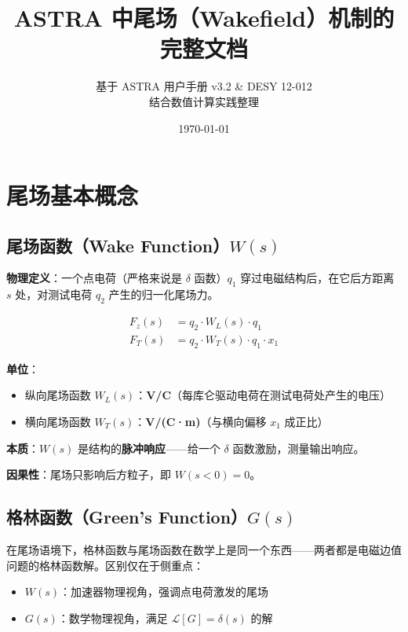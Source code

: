 \documentclass[a4paper,11pt]{article}
\title{\textbf{ASTRA 中尾场（Wakefield）机制的完整文档}}
\author{基于 ASTRA 用户手册 v3.2 \& DESY 12-012 \\ 结合数值计算实践整理}
\date{\today}
\begin{document}
\maketitle
\tableofcontents
\newpage

\section{尾场基本概念}

\subsection{尾场函数（Wake Function）$W(s)$}

\textbf{物理定义}：一个点电荷（严格来说是 $\delta$ 函数）$q_1$ 穿过电磁结构后，在它后方距离 $s$ 处，对测试电荷 $q_2$ 产生的归一化尾场力。

\begin{align}
  F_z(s) &= q_2 \cdot W_L(s) \cdot q_1 \label{eq:wake-long} \\
  F_T(s) &= q_2 \cdot W_T(s) \cdot q_1 \cdot x_1 \label{eq:wake-trans}
\end{align}

\textbf{单位}：
\begin{itemize}
  \item 纵向尾场函数 $W_L(s)$：\textbf{V/C}（每库仑驱动电荷在测试电荷处产生的电压）
  \item 横向尾场函数 $W_T(s)$：\textbf{V/(C·m)}（与横向偏移 $x_1$ 成正比）
\end{itemize}

\textbf{本质}：$W(s)$ 是结构的\textbf{脉冲响应}——给一个 $\delta$ 函数激励，测量输出响应。

\textbf{因果性}：尾场只影响后方粒子，即 $W(s<0) = 0$。

\subsection{格林函数（Green's Function）$G(s)$}

在尾场语境下，格林函数与尾场函数在数学上是同一个东西——两者都是电磁边值问题的格林函数解。区别仅在于侧重点：

\begin{itemize}
  \item \textbf{$W(s)$}：加速器物理视角，强调点电荷激发的尾场
  \item \textbf{$G(s)$}：数学物理视角，满足 $\mathcal{L}[G] = \delta(s)$ 的解
\end{itemize}
\end{document}
